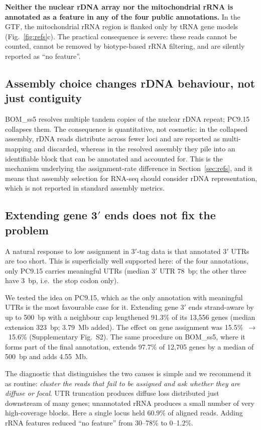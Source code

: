 \textbf{Neither the nuclear rDNA array nor the mitochondrial rRNA is annotated as a feature in
any of the four public annotations.} In the GTF, the mitochondrial rRNA region is flanked only
by tRNA gene models (Fig.~\ref{fig:refs}c). The practical consequence is severe: these reads
cannot be counted, cannot be removed by biotype-based rRNA filtering, and are silently
reported as ``no feature''.

\subsection{Assembly choice changes rDNA behaviour, not just contiguity}

BOM\_ss5 resolves multiple tandem copies of the nuclear rDNA repeat; PC9.15 collapses them.
The consequence is quantitative, not cosmetic: in the collapsed assembly, rDNA reads
distribute across fewer loci and are reported as multi-mapping and discarded, whereas in the
resolved assembly they pile into an identifiable block that can be annotated and accounted
for. This is the mechanism underlying the assignment-rate difference in Section~\ref{sec:refs},
and it means that assembly selection for RNA-seq should consider rDNA representation, which is
not reported in standard assembly metrics.

\subsection{Extending gene 3$'$ ends does not fix the problem}\label{sec:utr}

A natural response to low assignment in 3$'$-tag data is that annotated 3$'$ UTRs are too
short. This is superficially well supported here: of the four annotations, only PC9.15 carries
meaningful UTRs (median 3$'$ UTR 78~bp; the other three have 3~bp, i.e.\ the stop codon only).

We tested the idea on PC9.15, which as the only annotation with meaningful UTRs is the most
favourable case for it. Extending gene 3$'$ ends strand-aware by up to 500~bp with a neighbour
cap lengthened 91.3\% of its 13,556 genes (median extension 323~bp; 3.79~Mb added). The effect
on gene assignment was 15.5\%~$\rightarrow$~15.6\% (Supplementary Fig.~S2). The same procedure
on BOM\_ss5, where it forms part of the final annotation, extends 97.7\% of 12,705 genes by a
median of 500~bp and adds 4.55~Mb.

The diagnostic that distinguishes the two causes is simple and we recommend it as routine:
\emph{cluster the reads that fail to be assigned and ask whether they are diffuse or focal}.
UTR truncation produces diffuse loss distributed just downstream of many genes; unannotated
rRNA produces a small number of very high-coverage blocks. Here a single locus held 60.9\% of
aligned reads. Adding rRNA features reduced ``no feature'' from 30--78\% to 0--1.2\%.

